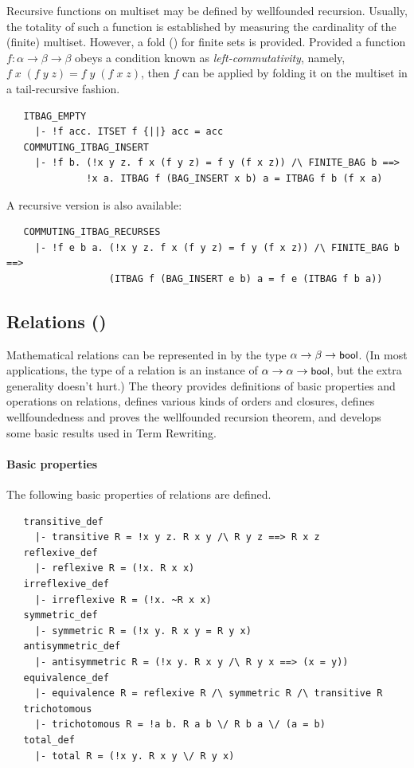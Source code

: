 Recursive functions on multiset may be defined by wellfounded
recursion. Usually, the totality of such a function is established by
measuring the cardinality of the (finite) multiset. However, a fold
() for finite sets is provided.  Provided a function
$f:\alpha\to\beta\to\beta$ obeys a condition known as
\emph{left-commutativity}, namely, $f\;x\;(f\;y\;z) =
f\;y\;(f\;x\;z)$, then $f$ can be applied by folding it on the
multiset in a tail-recursive fashion.
%
\begin{hol}
\begin{verbatim}
   ITBAG_EMPTY
     |- !f acc. ITSET f {||} acc = acc
   COMMUTING_ITBAG_INSERT
     |- !f b. (!x y z. f x (f y z) = f y (f x z)) /\ FINITE_BAG b ==>
              !x a. ITBAG f (BAG_INSERT x b) a = ITBAG f b (f x a)
\end{verbatim}
\end{hol}
%
A recursive version is also available:
\begin{hol}
\begin{verbatim}
   COMMUTING_ITBAG_RECURSES
     |- !f e b a. (!x y z. f x (f y z) = f y (f x z)) /\ FINITE_BAG b ==>
                  (ITBAG f (BAG_INSERT e b) a = f e (ITBAG f b a))
\end{verbatim}
\end{hol}

\subsection{Relations ()}\label{relation}

Mathematical relations can be represented in \HOL{} by the type
$\alpha \to\beta\to\mbox{\small{\textbf{\sf{bool}}}}$. (In most applications, the type of a
relation is an instance of $\alpha \to\alpha\to\mbox{\small{\textbf{\sf{bool}}}}$, but the
extra generality doesn't hurt.) The theory 
provides definitions of basic properties and operations on relations,
defines various kinds of orders and closures, defines wellfoundedness
and proves the wellfounded recursion theorem, and develops some
basic results used in Term Rewriting.

\paragraph {Basic properties}

The following basic properties of relations are defined.
%
\begin{hol}
\begin{verbatim}
   transitive_def
     |- transitive R = !x y z. R x y /\ R y z ==> R x z
   reflexive_def
     |- reflexive R = (!x. R x x)
   irreflexive_def
     |- irreflexive R = (!x. ~R x x)
   symmetric_def
     |- symmetric R = (!x y. R x y = R y x)
   antisymmetric_def
     |- antisymmetric R = (!x y. R x y /\ R y x ==> (x = y))
   equivalence_def
     |- equivalence R = reflexive R /\ symmetric R /\ transitive R
   trichotomous
     |- trichotomous R = !a b. R a b \/ R b a \/ (a = b)
   total_def
     |- total R = (!x y. R x y \/ R y x)
\end{verbatim}
\end{hol}

